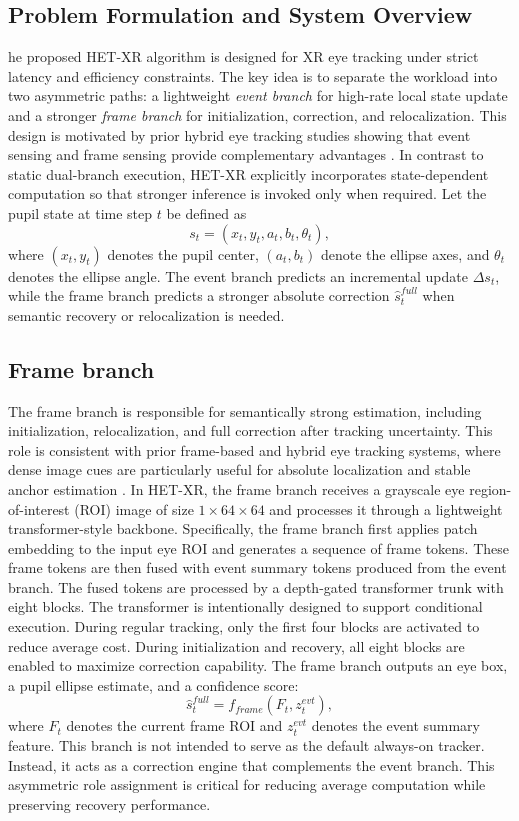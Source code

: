 \documentclass[journal]{IEEEtran}
\begin{document}
\subsection{Problem Formulation and System Overview}
he proposed HET-XR algorithm is designed for XR eye tracking under strict latency and efficiency constraints. The key idea is to separate the workload into two asymmetric paths: a lightweight \emph{event branch} for high-rate local state update and a stronger \emph{frame branch} for initialization, correction, and relocalization. This design is motivated by prior hybrid eye tracking studies showing that event sensing and frame sensing provide complementary advantages \cite{zhao2023ev,chen2025ex}. In contrast to static dual-branch execution, HET-XR explicitly incorporates state-dependent computation so that stronger inference is invoked only when required.
%
Let the pupil state at time step $t$ be defined as
\begin{equation}
s_t = (x_t, y_t, a_t, b_t, \theta_t),
\end{equation}
where $(x_t,y_t)$ denotes the pupil center, $(a_t,b_t)$ denote the ellipse axes, and $\theta_t$ denotes the ellipse angle. The event branch predicts an incremental update $\Delta s_t$, while the frame branch predicts a stronger absolute correction $\hat{s}_t^{full}$ when semantic recovery or relocalization is needed.
%
\subsection{Frame branch}
The frame branch is responsible for semantically strong estimation, including initialization, relocalization, and full correction after tracking uncertainty. This role is consistent with prior frame-based and hybrid eye tracking systems, where dense image cues are particularly useful for absolute localization and stable anchor estimation \cite{li2018etracker,feng2022real,chen2022real,chen2025ex}. In HET-XR, the frame branch receives a grayscale eye region-of-interest (ROI) image of size $1 \times 64 \times 64$ and processes it through a lightweight transformer-style backbone.
%
Specifically, the frame branch first applies patch embedding to the input eye ROI and generates a sequence of frame tokens. These frame tokens are then fused with event summary tokens produced from the event branch. The fused tokens are processed by a depth-gated transformer trunk with eight blocks. The transformer is intentionally designed to support conditional execution. During regular tracking, only the first four blocks are activated to reduce average cost. During initialization and recovery, all eight blocks are enabled to maximize correction capability. 
%
The frame branch outputs an eye box, a pupil ellipse estimate, and a confidence score:
\begin{equation}
\hat{s}_t^{full} = f_{frame}(F_t, z_t^{evt}),
\end{equation}
where $F_t$ denotes the current frame ROI and $z_t^{evt}$ denotes the event summary feature.
This branch is not intended to serve as the default always-on tracker. Instead, it acts as a correction engine that complements the event branch. This asymmetric role assignment is critical for reducing average computation while preserving recovery performance.
%
\end{document}
